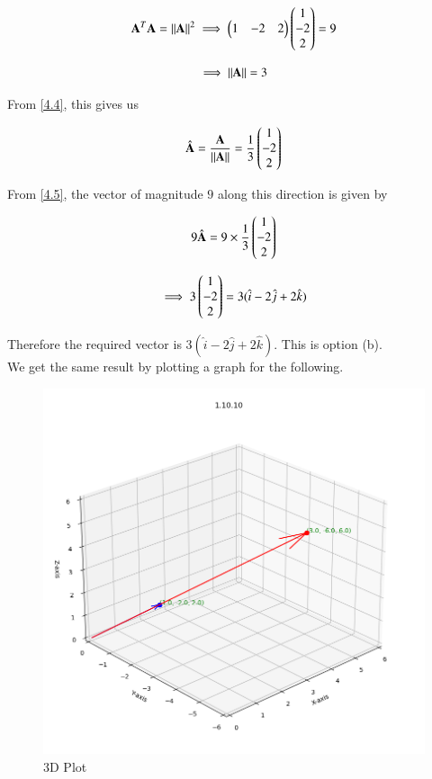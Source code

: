 \documentclass[journal]{IEEEtran}
\begin{document}
\begin{align}
    \textbf{A}^T\textbf{A} = \left\lVert\textbf{A}\right\rVert^2
    \label{4.3}
    \implies \begin{pmatrix}1 & -2 & 2\end{pmatrix} \begin{pmatrix}1 \\ -2 \\ 2\end{pmatrix} = 9
\end{align}

\begin{align}
    \implies \left\lVert\textbf{A}\right\rVert = 3
    \label{4.4}
\end{align}

From \ref{4.4}, this gives us

\begin{align}
    \hat{\textbf{A}} = \frac{\textbf{A}}{\left\lVert\textbf{A}\right\rVert} = \frac{1}{3} \begin{pmatrix}1 \\ -2 \\ 2\end{pmatrix}
    \label{4.5}
\end{align}

\newpage

From \ref{4.5}, the vector of magnitude $9$ along this direction is given by

\begin{align}
    9\hat{\textbf{A}} = 9 \times \frac{1}{3}\begin{pmatrix}1 \\ -2 \\ 2\end{pmatrix}
    \label{4.6}
\end{align}

\begin{align}
    \implies 3\begin{pmatrix}1 \\ -2 \\ 2\end{pmatrix} = 3(\hat{i}-2\hat{j}+2\hat{k})
    \label{4.7}
\end{align}

Therefore the required vector is $3(\hat{i}-2\hat{j}+2\hat{k})$. This is option (b).\\

We get the same result by plotting a graph for the following.
\begin{figure}[H]
    \centering
    \includegraphics[width=0.8\columnwidth]{figs/fig1.png}
    \caption{3D Plot}
    \label{3D Plot}
\end{figure}
\end{document}
